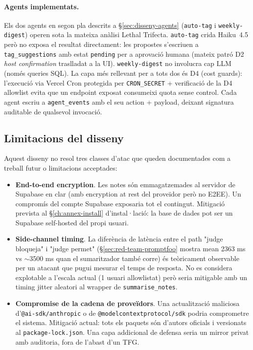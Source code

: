 \paragraph{Agents implementats.} Els dos agents en segon pla descrits a \S\ref{sec:disseny-agents} (\texttt{auto-tag} i \texttt{weekly-digest}) operen sota la mateixa anàlisi Lethal Trifecta. \texttt{auto-tag} crida Haiku~4.5 però no exposa el resultat directament: les propostes s'escriuen a \texttt{tag\_suggestions} amb estat \texttt{pending} per a aprovació humana (mateix patró D2 \emph{host confirmation} traslladat a la UI). \texttt{weekly-digest} no involucra cap LLM (només queries SQL). La capa més rellevant per a tots dos és D4 (cost guards): l'execució via Vercel Cron protegida per \texttt{CRON\_SECRET} + verificació de la D4 allowlist evita que un endpoint exposat consumeixi quota sense control. Cada agent escriu a \texttt{agent\_events} amb el seu action + payload, deixant signatura auditable de qualsevol invocació.

\subsection{Limitacions del disseny}
\label{sec:security-limitations}

Aquest disseny no resol tres classes d'atac que queden documentades com a treball futur o limitacions acceptades:

\begin{itemize}
    \item \textbf{End-to-end encryption}. Les notes són emmagatzemades al servidor de Supabase en clar (amb encryption at rest del proveïdor però no E2EE). Un compromís del compte Supabase exposaria tot el contingut. Mitigació prevista al \S\ref{ch:annex-install} d'instal·lació: la base de dades pot ser un Supabase self-hosted del propi usuari.
    \item \textbf{Side-channel timing}. La diferència de latència entre el path "judge bloqueja" i "judge permet" (\S\ref{sec:red-team-promptfoo} mostra mean 2363 ms vs $\sim$3500 ms quan el sumaritzador també corre) és teòricament observable per un atacant que pugui mesurar el temps de resposta. No es considera explotable a l'escala actual (1 usuari allowlistat) però seria mitigable amb un timing jitter aleatori al wrapper de \texttt{summarise\_notes}.
    \item \textbf{Compromise de la cadena de proveïdors}. Una actualització maliciosa d'\texttt{@ai-sdk/anthropic} o de \texttt{@modelcontextprotocol/sdk} podria comprometre el sistema. Mitigació actual: tots els paquets són d'autors oficials i versionats al \texttt{package-lock.json}. Una capa addicional de defensa seria un mirror privat amb auditoria, fora de l'abast d'un TFG.
\end{itemize}

